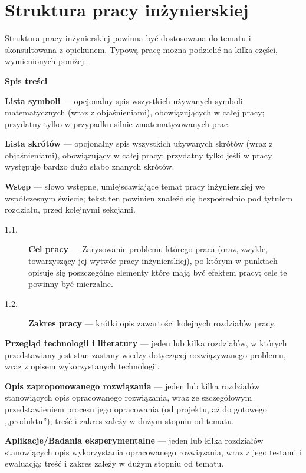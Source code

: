 \chapter{Struktura pracy inżynierskiej}%
\label{chap:structure}

Struktura pracy inżynierskiej powinna być dostosowana do tematu i skonsultowana z opiekunem. Typową pracę można podzielić na kilka części, wymienionych poniżej:
\begin{description}[
    leftmargin = !,
    labelwidth = 1em,
]
    \item[]   \textbf{Spis treści}
    \item[]   \textbf{Lista symboli} --- opcjonalny spis wszystkich używanych symboli matematycznych (wraz z objaśnieniami), obowiązujących w całej pracy; przydatny tylko w przypadku silnie zmatematyzowanych prac.
    \item[]   \textbf{Lista skrótów} --- opcjonalny spis wszystkich używanych skrótów (wraz z objaśnieniami), obowiązujący w całej pracy; przydatny tylko jeśli w pracy występuje bardzo dużo słabo znanych skrótów.
    \item[1.] \textbf{Wstęp} --- słowo wstępne, umiejscawiające temat pracy inżynierskiej we współczesnym świecie; tekst ten powinien znaleźć się bezpośrednio pod tytułem rozdziału, przed kolejnymi sekcjami.
    \begin{description}
        \item[1.1.] \textbf{Cel pracy} --- Zarysowanie problemu którego praca (oraz, zwykle, towarzyszący jej wytwór pracy inżynierskiej), po którym w punktach opisuje się poszczególne elementy które mają być efektem pracy; cele te powinny być mierzalne.
        \item[1.2.] \textbf{Zakres pracy} --- krótki opis zawartości kolejnych rozdziałów pracy.
    \end{description}
    \item[2.] \textbf{Przegląd technologii i literatury} --- jeden lub kilka rozdziałów, w których przedstawiany jest stan zastany wiedzy dotyczącej rozwiązywanego problemu, wraz z opisem wykorzystanych technologii.
    \item[3.] \textbf{Opis zaproponowanego rozwiązania} --- jeden lub kilka rozdziałów stanowiących opis opracowanego rozwiązania, wraz ze szczegółowym przedstawieniem procesu jego opracowania (od projektu, aż do gotowego ,,produktu''); treść i zakres zależy w dużym stopniu od tematu.
    \item[4.] \textbf{Aplikacje/Badania eksperymentalne} --- jeden lub kilka rozdziałów stanowiących opis wykorzystania opracowanego rozwiązania, wraz z jego testami i ewaluacją; treść i zakres zależy w dużym stopniu od tematu.

\end{description}
